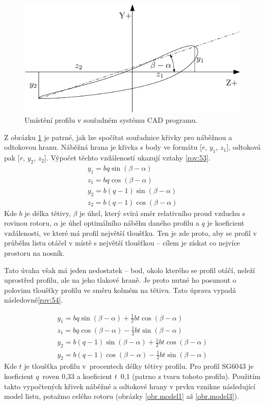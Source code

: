 	\begin{figure}[H]
			\centering
			\includegraphics[]{obrazky/profilvprostoru}
			\caption{Umístění profilu v souřadném systému CAD programu.}
			\label{obr.profilosy}
		\end{figure}
	Z obrázku \ref{obr.profilosy} je patrné, jak lze spočítat souřadnice křivky pro náběžnou a odtokovou hranu. Náběžná hrana je křivka s body ve formátu [$r$, $y_1$, $z_1$], odtoková pak [$r$, $y_2$, $z_2$]. Výpočet těchto vzdáleností ukazují vztahy \eqref{rov:53}.
	\begin{eqnarray}
		\label{rov:53}
		y_1=bq\sin(\beta-\alpha) \nonumber \\
		z_1=bq\cos(\beta-\alpha) \nonumber \\
		y_2=b(q-1)\sin(\beta-\alpha)\nonumber \\
		z_2=b(q-1)\cos(\beta-\alpha)
	\end{eqnarray}
	Kde $b$ je délka tětivy, $\beta$ je úhel, který svírá směr relativního proud vzduchu s rovinou rotoru, $\alpha$ je úhel optimálního náběhu daného profilu a $q$ je koeficient vzdálenosti, ve které má profil největší tloušťku. Ten je zde proto, aby se profil v průběhu listu otáčel v místě s největší tloušťkou – cílem je získat co nejvíce prostoru na nosník.
	
	Tato úvaha však má jeden nedostatek – bod, okolo kterého se profil otáčí, neleží uprostřed profilu, ale na jeho tlakové hraně. Je proto nutné ho posunout o polovinu tloušťky profilu ve směru kolmém na tětivu. Tato úprava vypadá následovně\eqref{rov:54}.
	
	\begin{eqnarray}
		\label{rov:54}
		y_1=bq\sin(\beta-\alpha)+\frac{1}{2}bt\cos(\beta-\alpha) \nonumber \\
		z_1=bq\cos(\beta-\alpha)-\frac{1}{2}bt\sin(\beta-\alpha) \nonumber \\
		y_2=b(q-1)\sin(\beta-\alpha)+\frac{1}{2}bt\cos(\beta-\alpha)\nonumber \\
		y_2=b(q-1)\cos(\beta-\alpha)-\frac{1}{2}bt\sin(\beta-\alpha)
	\end{eqnarray}
	Kde $t$ je tloušťka profilu v~procentech délky tětivy profilu.
	Pro profil SG6043 je koeficient $q$~roven 0,33 a koeficient $t$~0,1 (patrno z tvaru tohoto profilu).  Použitím takto vypočtených křivek náběžné a odtokové hrany v prvku  vznikne následující model listu, potažmo celého rotoru (obrázky \ref{obr.model1} až \ref{obr.model3}).
	
